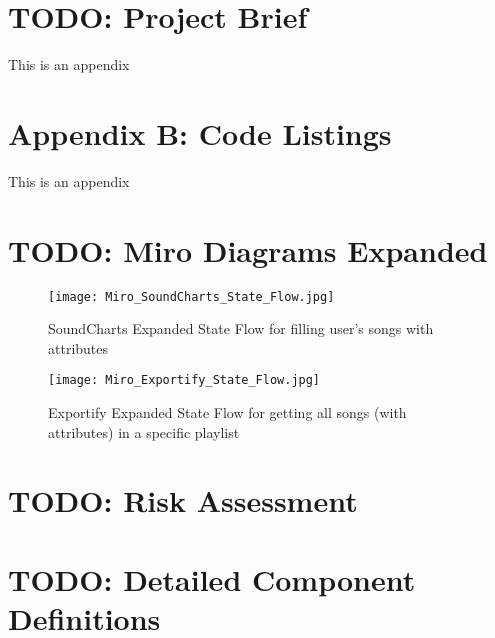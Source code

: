 \chapter{TODO: Project Brief} \label{appendix1}
This is an appendix

\chapter{Appendix B: Code Listings} \label{appendix2}
This is an appendix

\chapter{TODO: Miro Diagrams Expanded} \label{appendix::Miro}
\begin{figure}
    \texttt{[image: Miro\_SoundCharts\_State\_Flow.jpg]}
    \caption{SoundCharts Expanded State Flow for filling user's songs with attributes}
\end{figure}

\begin{figure}
    \texttt{[image: Miro\_Exportify\_State\_Flow.jpg]}
    \caption{Exportify Expanded State Flow for getting all songs (with attributes) in a specific playlist}
\end{figure}

\chapter{TODO: Risk Assessment}%

\chapter{TODO: Detailed Component Definitions}

